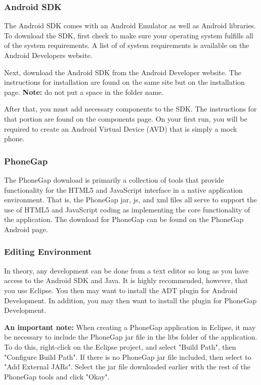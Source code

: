 \documentclass[12pt]{article}
\begin{document}
\begin{itemize}
\subsubsection{Android SDK}
The Android SDK comes with an Android Emulator as well as Android libraries.
To download the SDK, first check to make sure your operating system fulfills all of the system requirements.  A list of of system requirements is available on the Android Developers website\cite{AndroidSDK-SystemRequirements}.

Next, download the Android SDK from the Android Developer website\cite{AndroidSDK-Download}.
The instructions for installation are found on the same site but on the installation page\cite{AndroidSDK-Installation}. \textbf{Note:} do not put a space in the folder name.

After that, you must add necessary components to the SDK.  The instructions for that portion are found on the components page\cite{AndroidSDK-Components}.  On your first run, you will be required to create an Android Virtual Device (AVD) that is simply a mock phone.


\subsubsection{PhoneGap}
The PhoneGap download is primarily a collection of tools that provide functionality for the HTML5 and JavaScript interface in a native application environment.  That is, the PhoneGap jar, js, and xml files all serve to support the use of HTML5 and JavaScript coding as implementing the core functionality of the application.  The download for PhoneGap can be found on the PhoneGap Android page\cite{PhoneGap-Android}.


\subsubsection{Editing Environment}
In theory, any development can be done from a text editor so long as you have access to the Android SDK and Java.  It is highly recommended, however, that you use Eclipse\cite{Eclipse-Helios}.  You then may want to install the ADT plugin for Android Development\cite{Eclipse-ADT}.  In addition, you may then want to install the plugin for PhoneGap Development\cite{PhoneGap-Eclipse}.

\textbf{An important note:} When creating a PhoneGap application in Eclipse, it may be necessary to include the PhoneGap jar file in the libs folder of the application.  To do this, right-click on the Eclipse project, and select "Build Path", then "Configure Build Path".  If there is no PhoneGap jar file included, then select to "Add External JARs".  Select the jar file downloaded earlier with the rest of the PhoneGap tools and click "Okay".


\end{itemize}
\end{document}
